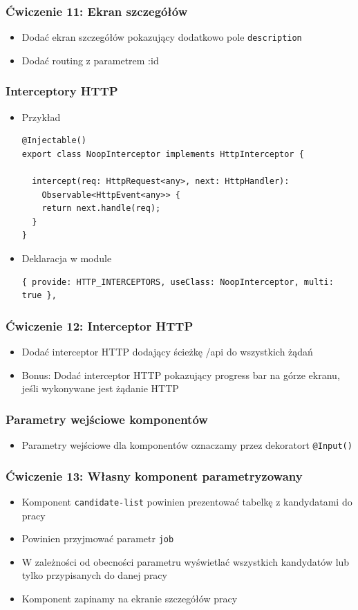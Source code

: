 \documentclass{beamer}
\begin{document}
\begin{frame}
    \frametitle{Ćwiczenie 11: Ekran szczegółów}
    \begin{itemize}
        \item Dodać ekran szczegółów pokazujący dodatkowo pole \lstinline{description}
        \item Dodać routing z parametrem :id
    \end{itemize}
\end{frame}

\begin{frame}[fragile]
    \frametitle{Interceptory HTTP}
    \begin{itemize}
        \item Przykład
\begin{lstlisting}
@Injectable()
export class NoopInterceptor implements HttpInterceptor {

  intercept(req: HttpRequest<any>, next: HttpHandler):
    Observable<HttpEvent<any>> {
    return next.handle(req);
  }
}
\end{lstlisting}
        \item Deklaracja w module
\begin{lstlisting}
{ provide: HTTP_INTERCEPTORS, useClass: NoopInterceptor, multi: true },
\end{lstlisting}
    \end{itemize}
\end{frame}

\begin{frame}
    \frametitle{Ćwiczenie 12: Interceptor HTTP}
    \begin{itemize}
        \item Dodać interceptor HTTP dodający ścieżkę /api do wszystkich żądań
        \item Bonus: Dodać interceptor HTTP pokazujący progress bar na górze ekranu, jeśli wykonywane jest żądanie HTTP
    \end{itemize}
\end{frame}

\begin{frame}
    \frametitle{Parametry wejściowe komponentów}
    \begin{itemize}
        \item Parametry wejściowe dla komponentów oznaczamy przez dekoratort \lstinline{@Input()}
    \end{itemize}
\end{frame}

\begin{frame}
    \frametitle{Ćwiczenie 13: Własny komponent parametryzowany}
    \begin{itemize}
        \item Komponent \lstinline{candidate-list} powinien prezentować tabelkę z kandydatami do pracy
        \item Powinien przyjmować parametr \lstinline{job}
        \item W zależności od obecności parametru wyświetlać wszystkich kandydatów lub tylko przypisanych do danej pracy
        \item Komponent zapinamy na ekranie szczegółów pracy
    \end{itemize}
\end{frame}
\end{document}
